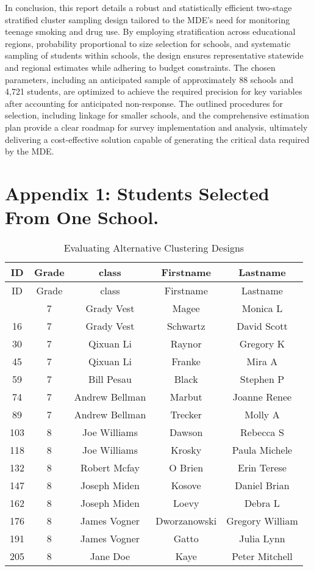 \documentclass[
  12pt]{article}
\begin{document}
In conclusion, this report details a robust and statistically efficient
two-stage stratified cluster sampling design tailored to the MDE's need
for monitoring teenage smoking and drug use. By employing stratification
across educational regions, probability proportional to size selection
for schools, and systematic sampling of students within schools, the
design ensures representative statewide and regional estimates while
adhering to budget constraints. The chosen parameters, including an
anticipated sample of approximately 88 schools and 4,721 students, are
optimized to achieve the required precision for key variables after
accounting for anticipated non-response. The outlined procedures for
selection, including linkage for smaller schools, and the comprehensive
estimation plan provide a clear roadmap for survey implementation and
analysis, ultimately delivering a cost-effective solution capable of
generating the critical data required by the MDE.

\newpage

\section{Appendix 1: Students Selected From One
School.}\label{appendix-1-students-selected-from-one-school.}

\begin{longtable}[]{@{}ccccc@{}}
\caption{Evaluating Alternative Clustering Designs}\tabularnewline
\toprule\noalign{}
ID & Grade & class & Firstname & Lastname \\
\midrule\noalign{}
\endfirsthead
\toprule\noalign{}
ID & Grade & class & Firstname & Lastname \\
\midrule\noalign{}
\endhead
\bottomrule\noalign{}
\endlastfoot
1 & 7 & Grady Vest & Magee & Monica L \\
16 & 7 & Grady Vest & Schwartz & David Scott \\
30 & 7 & Qixuan Li & Raynor & Gregory K \\
45 & 7 & Qixuan Li & Franke & Mira A \\
59 & 7 & Bill Pesau & Black & Stephen P \\
74 & 7 & Andrew Bellman & Marbut & Joanne Renee \\
89 & 7 & Andrew Bellman & Trecker & Molly A \\
103 & 8 & Joe Williams & Dawson & Rebecca S \\
118 & 8 & Joe Williams & Krosky & Paula Michele \\
132 & 8 & Robert Mcfay & O Brien & Erin Terese \\
147 & 8 & Joseph Miden & Kosove & Daniel Brian \\
162 & 8 & Joseph Miden & Loevy & Debra L \\
176 & 8 & James Vogner & Dworzanowski & Gregory William \\
191 & 8 & James Vogner & Gatto & Julia Lynn \\
205 & 8 & Jane Doe & Kaye & Peter Mitchell \\
\end{longtable}
\end{document}
